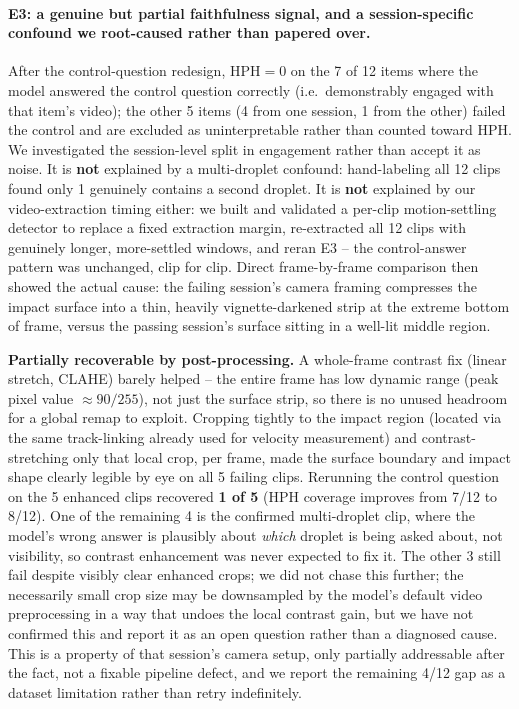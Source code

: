\documentclass[11pt]{article}
\newcommand{\hph}{\mathrm{HPH}}
\begin{document}
\paragraph{E3: a genuine but partial faithfulness signal, and a session-specific
confound we root-caused rather than papered over.} After the control-question
redesign, $\hph = 0$ on the 7 of 12 items where the model answered the control
question correctly (i.e.\ demonstrably engaged with that item's video); the
other 5 items (4 from one session, 1 from the other) failed the control and are
excluded as uninterpretable rather than counted toward $\hph$. We investigated
the session-level split in engagement rather than accept it as noise. It is
\textbf{not} explained by a multi-droplet confound: hand-labeling all 12 clips
found only 1 genuinely contains a second droplet. It is \textbf{not} explained
by our video-extraction timing either: we built and validated a per-clip
motion-settling detector to replace a fixed extraction margin, re-extracted all
12 clips with genuinely longer, more-settled windows, and reran E3 -- the
control-answer pattern was unchanged, clip for clip. Direct frame-by-frame
comparison then showed the actual cause: the failing session's camera framing
compresses the impact surface into a thin, heavily vignette-darkened strip at
the extreme bottom of frame, versus the passing session's surface sitting in a
well-lit middle region.

\noindent\textbf{Partially recoverable by post-processing.} A whole-frame
contrast fix (linear stretch, CLAHE) barely helped -- the entire frame has low
dynamic range (peak pixel value $\approx\!90/255$), not just the surface strip,
so there is no unused headroom for a global remap to exploit. Cropping tightly
to the impact region (located via the same track-linking already used for
velocity measurement) and contrast-stretching only that local crop, per frame,
made the surface boundary and impact shape clearly legible by eye on all 5
failing clips. Rerunning the control question on the 5 enhanced clips recovered
\textbf{1 of 5} ($\hph$ coverage improves from 7/12 to 8/12). One of the
remaining 4 is the confirmed multi-droplet clip, where the model's wrong answer
is plausibly about \emph{which} droplet is being asked about, not visibility,
so contrast enhancement was never expected to fix it. The other 3 still fail
despite visibly clear enhanced crops; we did not chase this further; the
necessarily small crop size may be downsampled by the model's default video
preprocessing in a way that undoes the local contrast gain, but we have not
confirmed this and report it as an open question rather than a diagnosed cause.
This is a property of that session's camera setup, only partially addressable
after the fact, not a fixable pipeline defect, and we report the remaining
4/12 gap as a dataset limitation rather than retry indefinitely.
\end{document}
